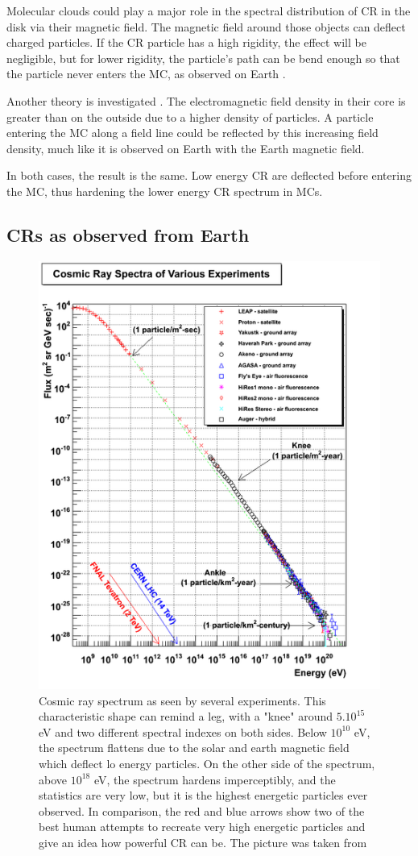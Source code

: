 Molecular clouds could play a major role in the spectral distribution of CR in the disk via their magnetic field. 
The magnetic field around those objects can deflect charged particles. If the CR particle has a high rigidity, the effect will be negligible, but for lower rigidity, the particle's path can be bend enough so that the particle never enters the MC, as observed on Earth \cite{Stormer1930}.

Another theory is investigated \cite{Ivlev2018}. The electromagnetic field density in their core is greater than on the outside due to a higher density of particles. A particle entering the MC along a field line could be reflected by this increasing field density, much like it is observed on Earth with the Earth magnetic field.


In both cases, the result is the same. Low energy CR are deflected before entering the MC, thus hardening the lower energy CR spectrum in MCs.



\subsection{CRs as observed from Earth}

\begin{figure}[h]
 \centering
 \includegraphics[width=.5\linewidth]{pic/theory/CR_spectrum.png}
 \caption[CR spectrum as observed on Earth.]{Cosmic ray spectrum as seen by several experiments. This characteristic shape can remind a leg, with a "knee" around $5.10^{15}$ eV and two different spectral indexes on both sides. Below $10^{10}$ eV, the spectrum flattens due to the solar and earth magnetic field which deflect lo energy particles. On the other side of the spectrum, above $10^{18}$ eV, the spectrum hardens imperceptibly, and the statistics are very low, but it is the highest energetic particles ever observed. In comparison, the red and blue arrows show two of the best human attempts to recreate very high energetic particles and give an idea how powerful CR can be. The picture was taken from \cite{CRspec}}
 \label{fig:CR_spectrum}
\end{figure}


